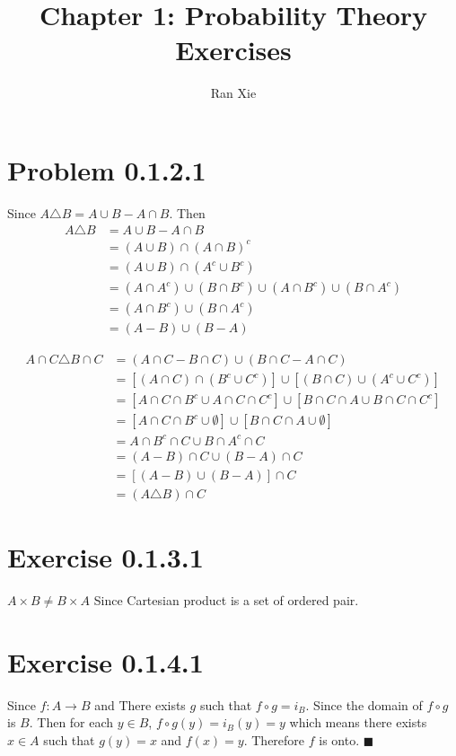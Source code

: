 \documentclass[12pt]{article}
\title{Chapter 1: Probability Theory Exercises}
\author{Ran Xie}
\begin{document}
\maketitle
	
\section*{Problem 0.1.2.1}
Since $A \triangle B = A \cup B - A \cap B$. Then 
$$ \begin{aligned}
	A \triangle B &= A \cup B - A \cap B \\
	&= (A \cup B) \cap (A \cap B)^c \\
	&= (A \cup B) \cap (A^c \cup B^c) \\
	&= (A \cap A^c) \cup (B \cap B^c) \cup (A \cap B^c) \cup (B \cap A^c) \\
	&= (A \cap B^c) \cup (B \cap A^c) \\
	&= (A - B) \cup (B - A)
\end{aligned}
$$

$$ \begin{aligned}
	A \cap C \triangle B \cap C &= (A \cap C - B \cap C) \cup (B \cap C - A \cap C) \\
	&= [(A\cap C) \cap (B^c \cup C^c)] \cup [ (B \cap C) \cup (A^c \cup C^c)] \\
	&= [A \cap C \cap B^c \cup A \cap C \cap C^c ] \cup [ B \cap C \cap A \cup B \cap C \cap C^c] \\
	&= [A \cap C \cap B^c \cup \emptyset ] \cup [ B \cap C \cap A \cup \emptyset] \\
	&=  A \cap B^c \cap C \cup  B \cap A^c \cap C  \\
	&= (A-B)\cap C  \cup (B - A) \cap C \\
	&=  [(A - B) \cup (B-A)] \cap C \\
	&= 	(A \triangle B) \cap C   
\end{aligned}
$$
\section*{Exercise 0.1.3.1}
$A \times B \neq B \times A$ Since Cartesian product is a set of ordered pair. 

\section*{Exercise 0.1.4.1}
Since $f : A \rightarrow B$ and There exists $g$ such that $f \circ g = i_B$.  Since the domain of $f \circ g$ is $B$. Then for each $y \in B$, $f \circ g(y) = i_B(y) = y$ which means there exists $x \in A$ such that $g(y) = x$ and $f(x) = y$. Therefore $f$ is onto.  $\blacksquare$
\end{document}

